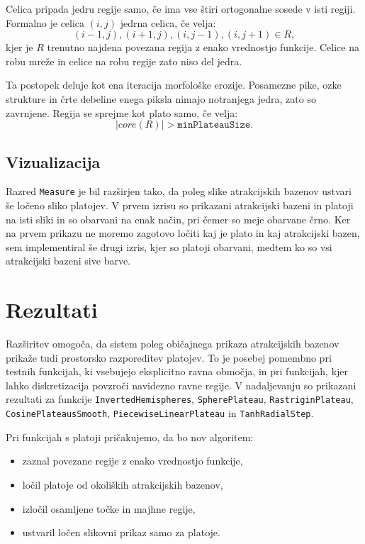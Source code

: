 \documentclass[12pt,a4paper]{article}
\begin{document}
    Celica pripada jedru regije samo, če ima vse štiri ortogonalne sosede v isti regiji. Formalno je celica \((i,j)\) jedrna celica, če velja:
    \[
    (i-1,j), (i+1,j), (i,j-1), (i,j+1) \in R,
    \]
    kjer je \(R\) trenutno najdena povezana regija z enako vrednostjo funkcije. Celice na robu mreže in celice na robu regije zato niso del jedra.
    
    Ta postopek deluje kot ena iteracija morfološke erozije. Posamezne pike, ozke strukture in črte debeline enega piksla nimajo notranjega jedra, zato so zavrnjene. Regija se sprejme kot plato samo, če velja:
    \[
    |core(R)| > \texttt{minPlateauSize}.
    \]
    
    
    \subsection{Vizualizacija}
    
    Razred \texttt{Measure} je bil razširjen tako, da poleg slike atrakcijskih bazenov ustvari še ločeno sliko platojev. V prvem izrisu so prikazani atrakcijski bazeni in platoji na isti sliki in so obarvani na enak način, pri čemer so meje obarvane črno. Ker na prvem prikazu ne moremo zagotovo ločiti kaj je plato in kaj atrakcijski bazen, sem implementiral še drugi izris, kjer so platoji obarvani, medtem ko so vsi atrakcijski bazeni sive barve. 
    
    \section{Rezultati}
    
    Razširitev omogoča, da sistem poleg običajnega prikaza atrakcijskih bazenov prikaže tudi prostorsko razporeditev platojev. To je posebej pomembno pri testnih funkcijah, ki vsebujejo eksplicitno ravna območja, in pri funkcijah, kjer lahko diskretizacija povzroči navidezno ravne regije. V nadaljevanju so prikazani rezultati za funkcije \texttt{InvertedHemispheres}, \texttt{SpherePlateau}, \texttt{RastriginPlateau}, \texttt{CosinePlateausSmooth}, \texttt{PiecewiseLinearPlateau} in \texttt{TanhRadialStep}.
    
    Pri funkcijah s platoji pričakujemo, da bo nov algoritem:
    
    \begin{itemize}
        \item zaznal povezane regije z enako vrednostjo funkcije,
        \item ločil platoje od okoliških atrakcijskih bazenov,
        \item izločil osamljene točke in majhne regije,
        \item ustvaril ločen slikovni prikaz samo za platoje.
    \end{itemize}
    
\end{document}

